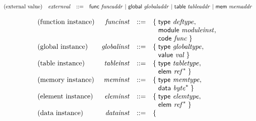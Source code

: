 \vspace{1ex}

$$
\begin{array}{@{}lrrl@{}l@{}}
\mbox{(external value)} & {\mathit{externval}} &::=& \mathsf{func}~{\mathit{funcaddr}} ~|~ \mathsf{global}~{\mathit{globaladdr}} ~|~ \mathsf{table}~{\mathit{tableaddr}} ~|~ \mathsf{mem}~{\mathit{memaddr}} \\
\end{array}
$$

\vspace{1ex}

\vspace{1ex}

$$
\begin{array}{@{}lrrl@{}l@{}}
\mbox{(function instance)} & {\mathit{funcinst}} &::=& \{\; \begin{array}[t]{@{}l@{}l@{}}
\mathsf{type}~{\mathit{deftype}},\; \\
  \mathsf{module}~{\mathit{moduleinst}},\; \\
  \mathsf{code}~{\mathit{func}} \;\}\end{array} \\
\mbox{(global instance)} & {\mathit{globalinst}} &::=& \{\; \begin{array}[t]{@{}l@{}l@{}}
\mathsf{type}~{\mathit{globaltype}},\; \\
  \mathsf{value}~{\mathit{val}} \;\}\end{array} \\
\mbox{(table instance)} & {\mathit{tableinst}} &::=& \{\; \begin{array}[t]{@{}l@{}l@{}}
\mathsf{type}~{\mathit{tabletype}},\; \\
  \mathsf{elem}~{{\mathit{ref}}^\ast} \;\}\end{array} \\
\mbox{(memory instance)} & {\mathit{meminst}} &::=& \{\; \begin{array}[t]{@{}l@{}l@{}}
\mathsf{type}~{\mathit{memtype}},\; \\
  \mathsf{data}~{{\mathit{byte}}^\ast} \;\}\end{array} \\
\mbox{(element instance)} & {\mathit{eleminst}} &::=& \{\; \begin{array}[t]{@{}l@{}l@{}}
\mathsf{type}~{\mathit{elemtype}},\; \\
  \mathsf{elem}~{{\mathit{ref}}^\ast} \;\}\end{array} \\
\mbox{(data instance)} & {\mathit{datainst}} &::=& \{\; \begin{array}[t]{@{}l@{}l@{}}

\end{array}
\end{array}$$
